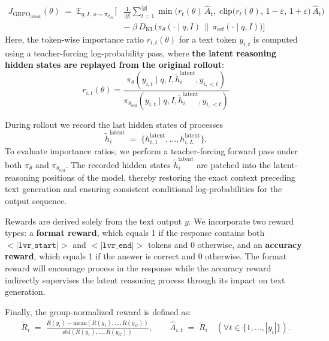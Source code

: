 \begin{align}
J_{\mathrm{GRPO_{latent}}}(\theta) \;=\; 
\mathbb{E}_{q,I,\; o \sim \pi_{\theta_{\mathrm{old}}}}
\Bigg[
&\frac{1}{|y|}\sum_{t=1}^{|y|}
\min\Big(
r_{t}(\theta)\,\hat{A}_{t},\;
\mathrm{clip}\big(r_{t}(\theta),\,1-\varepsilon,\,1+\varepsilon\big)\,\hat{A}_{t}
\Big) \nonumber \\
&-\;\beta\, D_{\mathrm{KL}}\!\big(\pi_{\theta}(\cdot\mid q,I)\,\|\,\pi_{\mathrm{ref}}(\cdot\mid q,I)\big)
\Bigg]
\end{align}
Here, the token-wise importance ratio $r_{i,t}(\theta)$ for a text token $y_{i,t}$ is computed using a teacher-forcing log-probability pass, where \textbf{the latent reasoning hidden states are replayed from the original rollout}:
\begin{equation}
r_{i,t}(\theta) = \frac{\pi_{\theta}(y_{i,t}\mid q, I, \widetilde{h}^{\mathrm{latent}}_{i}, y_{i,<t})}{\pi_{\theta_{\mathrm{old}}}(y_{i,t}\mid q, I, \widetilde{h}^{\mathrm{latent}}_{i}, y_{i,<t})}
\end{equation}

During rollout we record the last hidden states of \modelname processes
\[
\widetilde{h}^{\mathrm{latent}}_{i} \;=\; \{ h^{\mathrm{latent}}_{i,1}, \dots, h^{\mathrm{latent}}_{i,L} \}.
\]
To evaluate importance ratios, we perform a teacher-forcing forward pass under both $\pi_{\theta}$ and $\pi_{\theta_{\mathrm{old}}}$. The recorded hidden states $\widetilde{h}^{\mathrm{latent}}_{i}$ are patched into the latent-reasoning positions of the model, thereby restoring the exact context preceding text generation and ensuring consistent conditional log-probabilities for the output sequence.

Rewards are derived solely from the text output $y$. We incorporate two reward types: a \textbf{format reward}, which equals 1 if the response contains both $<\vert\texttt{lvr\_start}\vert>$ and $<\vert\texttt{lvr\_end}\vert>$ tokens and 0 otherwise, and an \textbf{accuracy reward}, which equals 1 if the answer is correct and 0 otherwise. The format reward will encourage \modelname process in the response while the accuracy reward indirectly supervises the latent reasoning process through its impact on text generation.

Finally, the group-normalized reward is defined as:
\begin{align}
\tilde{R}_i \;=\; \frac{R(y_i)-\mathrm{mean}(R(y_{1}),\dots,R(y_{G}))}
{\mathrm{std}(R(y_{1}),\dots,R(y_{G}))}, \qquad
\hat{A}_{i,t} \;=\; \tilde{R}_i \quad (\forall t\in\{1,\dots,|y_i|\}).
\label{eq:adv_text_only}
\end{align}

